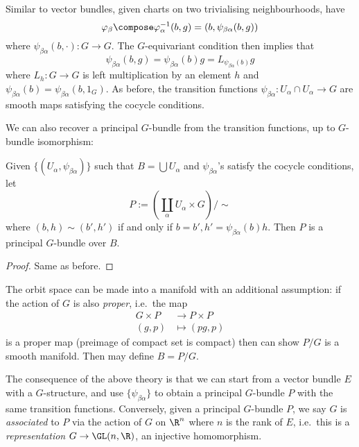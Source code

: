 \documentclass[a4paper]{article}
\begin{document}
Similar to vector bundles, given charts on two trivialising neighbourhoods, have
\[
  \varphi_\beta \compose \varphi_\alpha^{-1} (b, g) = (b, \psi_{\beta\alpha}(b, g))
\]
where \(\psi_{\beta\alpha}(b, \cdot): G \to G\). The \(G\)-equivariant condition then implies that
\[
  \psi_{\beta\alpha}(b, g) = \psi_{\beta\alpha}(b) g = L_{\psi_{\beta\alpha}(b)} g
\]
where \(L_h : G \to G\) is left multiplication by an element \(h\) and \(\psi_{\beta\alpha}(b) = \psi_{\beta\alpha} (b, 1_G)\).
As before, the transition functions \(\psi_{\beta\alpha}: U_\alpha \cap U_\alpha \to G\) are smooth maps satisfying the cocycle conditions.

We can also recover a principal \(G\)-bundle from the transition functions, up to \(G\)-bundle isomorphism:

\begin{theorem}
  Given \(\{(U_\alpha, \psi_{\beta\alpha})\}\) such that \(B = \bigcup U_\alpha\) and \(\psi_{\beta\alpha}\)'s satisfy the cocycle conditions, let
  \[
    P := \left(\coprod_\alpha U_\alpha \times G \right) / \sim
  \]
  where \((b, h) \sim (b', h')\) if and only if \(b = b', h' = \psi_{\beta\alpha}(b)h\). Then \(P\) is a principal \(G\)-bundle over \(B\).
\end{theorem}

\begin{proof}
  Same as before.
\end{proof}

\begin{remark}
  The orbit space can be made into a manifold with an additional assumption: if the action of \(G\) is also \emph{proper}, i.e.\ the map
  \begin{align*}
    G \times P &\to P \times P \\
    (g, p) &\mapsto (pg, p)
  \end{align*}
  is a proper map (preimage of compact set is compact) then can show \(P/G\) is a smooth manifold. Then may define \(B = P/G\).
\end{remark}

The consequence of the above theory is that we can start from a vector bundle \(E\) with a \(G\)-structure, and use \(\{\psi_{\beta\alpha}\}\) to obtain a principal \(G\)-bundle \(P\) with the same transition functions. Conversely, given a principal \(G\)-bundle \(P\), we say \(G\) is \emph{associated} to \(P\) via the action of \(G\) on \(\R^n\) where \(n\) is the rank of \(E\), i.e.\ this is a \emph{representation} \(G \to \GL(n, \R)\), an injective homomorphism.
\end{document}
